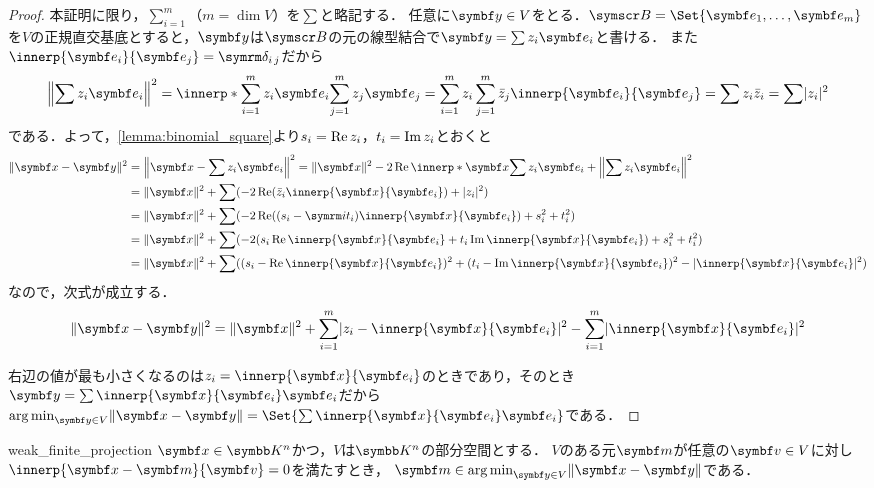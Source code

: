 \documentclass[../../main]{subfiles}
\begin{document}
\begin{proof}
  本証明に限り，\(\sum_{i=1}^m\)（\(m=\dim V\)）を\(\sum\)と略記する．
  任意に\(\vect{y}\in V\)をとる．\(\basis{B}=\Set{\vect{e}_1,\dots,\vect{e}_m}\)を\(V\)の正規直交基底とすると，\(\vect{y}\)は\(\basis{B}\)の元の線型結合で\(\vect{y}=\sum z_i\vect{e}_i\)と書ける．
  また\(\innerp{\vect{e}_i}{\vect{e}_j}=\kdelta{i}{j}\)だから
  \[
    \vnorm*{\sum z_i\vect{e}_i}^2 = \innerp*{\sum_{i=1}^mz_i\vect{e}_i}{\sum_{j=1}^mz_j\vect{e}_j}
    = \sum_{i=1}^mz_i\sum_{j=1}^m\conj{z}_j\innerp{\vect{e}_i}{\vect{e}_j}
    = \sum z_i\conj{z}_i
    = \sum\abs{z_i}^2
  \]
  である．よって，\cref{lemma:binomial_square}より\(s_i=\operatorname{Re} z_i\)，\(t_i=\operatorname{Im} z_i\)とおくと
  \begin{align*}
    \vnorm{\vect{x}-\vect{y}}^2 &= \vnorm*{\vect{x}-\sum z_i\vect{e}_i}^2
    = \vnorm{\vect{x}}^2-2\rpart\innerp*{\vect{x}}{\sum z_i\vect{e}_i}+\vnorm*{\sum z_i\vect{e}_i}^2 \\
    &= \vnorm{\vect{x}}^2+\sum(-2\rpart(\conj{z}_i\innerp{\vect{x}}{\vect{e}_i})+\abs{z_i}^2) \\
    &= \vnorm{\vect{x}}^2+\sum(-2\rpart((s_i-\iuni t_i)\innerp{\vect{x}}{\vect{e}_i})+s_i^2+t_i^2) \\
    &= \vnorm{\vect{x}}^2+\sum(-2(s_i\rpart\innerp{\vect{x}}{\vect{e}_i}+t_i\ipart\innerp{\vect{x}}{\vect{e}_i})+s_i^2+t_i^2) \\
    &= \vnorm{\vect{x}}^2+\sum((s_i-\rpart\innerp{\vect{x}}{\vect{e}_i})^2+(t_i-\ipart\innerp{\vect{x}}{\vect{e}_i})^2-\abs{\innerp{\vect{x}}{\vect{e}_i}}^2)
  \end{align*}
  なので，次式が成立する．
  \begin{equation}
    \label{equation:pre_bessels_inequality}
    \vnorm{\vect{x}-\vect{y}}^2 = \vnorm{\vect{x}}^2+\sum_{i=1}^m\abs{z_i-\innerp{\vect{x}}{\vect{e}_i}}^2-\sum_{i=1}^m\abs{\innerp{\vect{x}}{\vect{e}_i}}^2
  \end{equation}

  右辺の値が最も小さくなるのは\(z_i=\innerp{\vect{x}}{\vect{e}_i}\)のときであり，そのとき\(\vect{y}=\sum\innerp{\vect{x}}{\vect{e}_i}\vect{e}_i\)だから
  \(\argmin_{\vect{y}\in V}\vnorm{\vect{x}-\vect{y}}=\Set{\sum\innerp{\vect{x}}{\vect{e}_i}\vect{e}_i}\)である．
\end{proof}

\begin{proposition}{}{weak_finite_projection}
  \(\vect{x}\in\numset{K}^n\)かつ，\(V\)は\(\numset{K}^n\)の部分空間とする．
  \(V\)のある元\(\vect{m}\)が任意の\(\vect{v}\in V\)に対し\(\innerp{\vect{x}-\vect{m}}{\vect{v}}=0\)を満たすとき，
  \(\vect{m}\in\argmin_{\vect{y}\in V}\vnorm{\vect{x}-\vect{y}}\)である．
\end{proposition}
\end{document}
